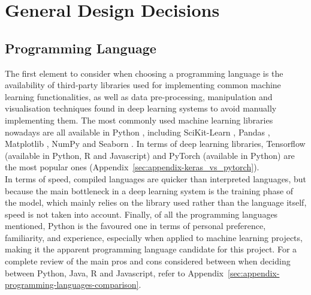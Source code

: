 \section{General Design Decisions}

\subsection{Programming Language}


The first element to consider when choosing a programming language is the availability of third-party libraries used for implementing common machine learning functionalities, as well as data pre-processing, manipulation and visualisation techniques found in deep learning systems to avoid manually implementing them. The most commonly used machine learning libraries nowadays are all available in Python \citep{raschka2017python}, including SciKit-Learn \citep{scikit-learn}, Pandas \citep{reback2020pandas}, Matplotlib \citep{Hunter:2007}, NumPy \citep{numpy} and Seaborn \citep{seaborn}. In terms of deep learning libraries, Tensorflow (available in Python, R and Javascript) and PyTorch (available in Python) are  the most popular ones (Appendix~\ref{sec:appendix-keras_vs_pytorch}).\\

In terms of speed, compiled languages are quicker than interpreted languages, but because the main bottleneck in a deep learning system is the training phase of the model, which mainly relies on the library used rather than the language itself, speed is not taken into account. Finally, of all the programming languages mentioned, Python is the favoured one in terms of personal preference, familiarity, and experience, especially when applied to machine learning projects, making it the apparent programming language candidate for this project. For a complete review of the main pros and cons considered between when deciding between Python, Java, R and Javascript, refer to Appendix~\ref{sec:appendix-programming-languages-comparison}.

